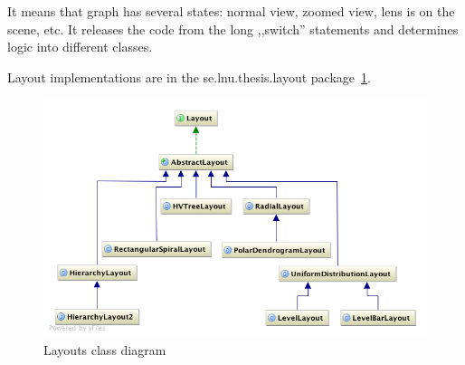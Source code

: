 It means that graph has several states: normal view, zoomed view, lens is on the scene, etc. It releases the code from the long ,,switch'' statements  and determines logic into different classes.  

Layout implementations are in the \textsf{se.lnu.thesis.layout} package~\ref{fig:uml_layouts}.

\begin{figure}[h!]
\centering
\includegraphics[scale=0.5]{pictures/uml_layouts.png}
\caption{Layouts class diagram}
\label{fig:uml_layouts}
\end{figure}
